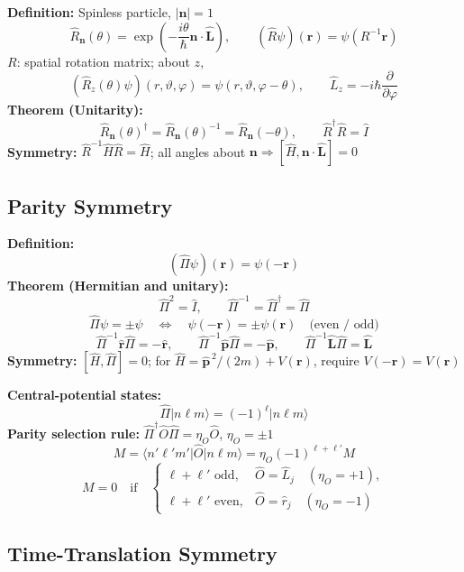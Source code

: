 \documentclass[12pt]{article}
\begin{document}
\textbf{Definition:} Spinless particle, $|\boldsymbol n|=1$
\[
  \hat R_{\boldsymbol n}(\theta)
  =\exp\left(-\frac{i\theta}{\hbar}\boldsymbol n\cdot\hat{\boldsymbol L}\right),
  \qquad (\hat R\psi)(\boldsymbol r)=\psi(R^{-1}\boldsymbol r)
\]
$R$: spatial rotation matrix; about $z$,
\[
  (\hat R_z(\theta)\psi)(r,\vartheta,\varphi)
  =\psi(r,\vartheta,\varphi-\theta),\qquad
  \hat L_z=-i\hbar\frac{\partial}{\partial\varphi}
\]
\textbf{Theorem (Unitarity):}
\[
  \hat R_{\boldsymbol n}(\theta)^\dagger
  =\hat R_{\boldsymbol n}(\theta)^{-1}
  =\hat R_{\boldsymbol n}(-\theta),\qquad \hat R^\dagger\hat R=\hat I
\]
\textbf{Symmetry:} $\hat R^{-1}\hat H\hat R=\hat H$;
all angles about $\boldsymbol n\Rightarrow[\hat H,\boldsymbol n\cdot\hat{\boldsymbol L}]=0$

\subsection{Parity Symmetry}

\textbf{Definition:}
\[
  (\hat\Pi\psi)(\boldsymbol r)=\psi(-\boldsymbol r)
\]
\textbf{Theorem (Hermitian and unitary):}
\[
  \hat\Pi^2=\hat I,\qquad \hat\Pi^{-1}=\hat\Pi^\dagger=\hat\Pi
\]
\[
  \hat\Pi\psi=\pm\psi
  \quad\Longleftrightarrow\quad
  \psi(-\boldsymbol r)=\pm\psi(\boldsymbol r)
  \quad\text{(even / odd)}
\]
\[
  \hat\Pi^{-1}\hat{\boldsymbol r}\hat\Pi=-\hat{\boldsymbol r},\qquad
  \hat\Pi^{-1}\hat{\boldsymbol p}\hat\Pi=-\hat{\boldsymbol p},\qquad
  \hat\Pi^{-1}\hat{\boldsymbol L}\hat\Pi=\hat{\boldsymbol L}
\]
\textbf{Symmetry:} $[\hat H,\hat\Pi]=0$;
for $\hat H=\hat{\boldsymbol p}^{\,2}/(2m)+V(\boldsymbol r)$, require $V(-\boldsymbol r)=V(\boldsymbol r)$

\textbf{Central-potential states:}
\[
  \hat\Pi\lvert n\ell m\rangle=(-1)^\ell\lvert n\ell m\rangle
\]
\textbf{Parity selection rule:} $\hat\Pi^\dagger\hat O\hat\Pi=\eta_O\hat O$, $\eta_O=\pm1$
\[
  M=\langle n'\ell'm'\lvert\hat O\rvert n\ell m\rangle
  =\eta_O(-1)^{\ell+\ell'}M
\]
\[
  M=0\quad\text{if}\quad
  \begin{cases}
    \ell+\ell'\text{ odd},&\hat O=\hat L_j\quad(\eta_O=+1),\\
    \ell+\ell'\text{ even},&\hat O=\hat r_j\quad(\eta_O=-1)
  \end{cases}
\]

\subsection{Time-Translation Symmetry}
\end{document}
